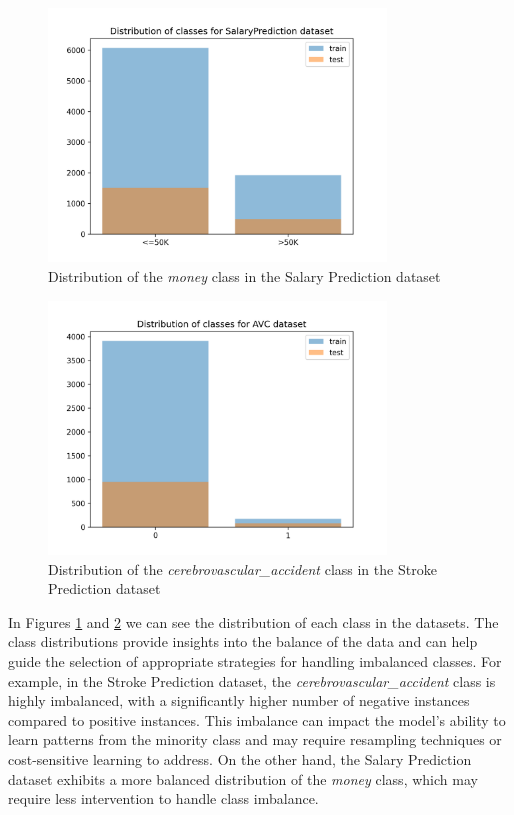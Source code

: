 \documentclass[runningheads]{paper}
\begin{document}
\begin{figure}[H]
    \centering
    \includegraphics[width=0.8\textwidth]{../plots/distribution_SalaryPrediction.png}
    \caption{Distribution of the \textit{money} class in the Salary Prediction dataset}
    \label{fig:distribution_salary}
\end{figure}

\begin{figure}[H]
    \centering
    \includegraphics[width=0.8\textwidth]{../plots/distribution_AVC.png}
    \caption{Distribution of the \textit{cerebrovascular\_accident} class in the Stroke Prediction dataset}
    \label{fig:distribution_stroke}
\end{figure}

In Figures \ref{fig:distribution_salary} and \ref{fig:distribution_stroke} we can
see the distribution of each class in the datasets. The class distributions provide
insights into the balance of the data and can help guide the selection of appropriate
strategies for handling imbalanced classes. For example, in the Stroke Prediction
dataset, the \textit{cerebrovascular\_accident} class is highly imbalanced, with
a significantly higher number of negative instances compared to positive instances.
This imbalance can impact the model's ability to learn patterns from the minority
class and may require resampling techniques or cost-sensitive learning to address.
On the other hand, the Salary Prediction dataset exhibits a more balanced distribution
of the \textit{money} class, which may require less intervention to handle class
imbalance.
\end{document}
